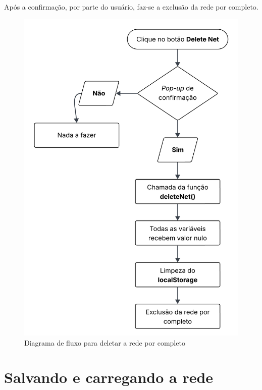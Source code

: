 \documentclass[
	12pt,				%
	openright,			%
	oneside,			%
	a4paper,			%
	english,			%
	brazil				%
	]{abntex2}
\begin{document}


Após a confirmação, por parte do usuário, faz-se a exclusão da rede por completo.

\begin{figure}[ht] 
	\centering
	\includegraphics[scale=0.2]{figuras/diagrama-fluxo-deleteNet.png}
	\caption[Diagrama de fluxo para deletar a rede por completo]{Diagrama de fluxo para deletar a rede por completo}
	\label{fig:deleteNetDiagram}
\end{figure}
\FloatBarrier

\section{Salvando e carregando a rede}\label{cap:saveLoadNet}
\end{document}
